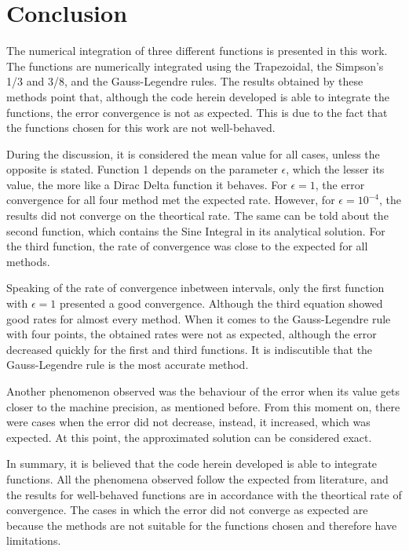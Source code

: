 \section{Conclusion}\label{sec:conclusion}
The numerical integration of three different functions is presented in this work. The functions are numerically integrated using the Trapezoidal, the Simpson's 1/3 and 3/8, and the Gauss-Legendre rules. The results obtained by these methods point that, although the code herein developed is able to integrate the functions, the error convergence is not as expected. This is due to the fact that the functions chosen for this work are not well-behaved. 

During the discussion, it is considered the mean value for all cases, unless the opposite is stated. Function 1 depends on the parameter $\epsilon$, which the lesser its value, the more like a Dirac Delta function it behaves. For $\epsilon = 1$, the error convergence for all four method met the expected rate. However, for $\epsilon = 10^{-4}$, the results did not converge on the theortical rate. The same can be told about the second function, which contains the Sine Integral in its analytical solution. For the third function, the rate of convergence was close to the expected for all methods. 

Speaking of the rate of convergence inbetween intervals, only the first function with $\epsilon = 1$ presented a good convergence. Although the third equation showed good rates for almost every method. When it comes to the Gauss-Legendre rule with four points, the obtained rates were not as expected, although the error decreased quickly for the first and third functions. It is indiscutible that the Gauss-Legendre rule is the most accurate method. 

Another phenomenon observed was the behaviour of the error when its value gets closer to the machine precision, as mentioned before. From this moment on, there were cases when the error did not decrease, instead, it increased, which was expected. At this point, the approximated solution can be considered exact.

In summary, it is believed that the code herein developed is able to integrate functions. All the phenomena observed follow the expected from literature, and the results for well-behaved functions are in accordance with the theortical rate of convergence. The cases in which the error did not converge as expected are because the methods are not suitable for the functions chosen and therefore have limitations.